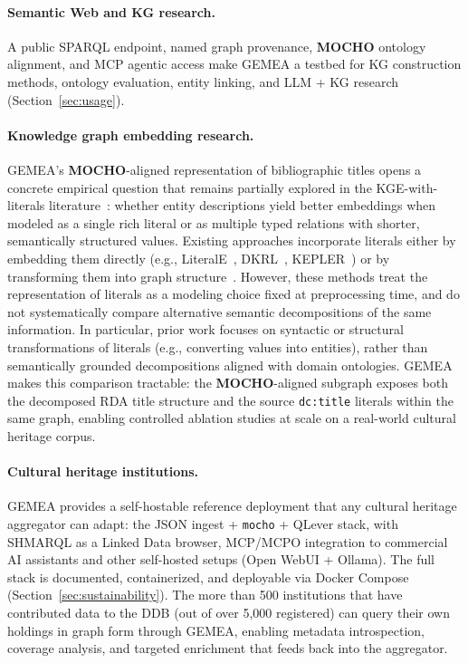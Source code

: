\paragraph{Semantic Web and KG research.}
A public SPARQL endpoint, named graph provenance, \textbf{MOCHO} ontology alignment, and MCP agentic access make GEMEA a testbed for KG construction methods, ontology evaluation, entity linking, and LLM + KG research (Section~\ref{sec:usage}).

\paragraph{Knowledge graph embedding research.}
GEMEA's \textbf{MOCHO}-aligned representation of bibliographic titles opens a concrete empirical question that remains partially explored in the KGE-with-literals literature~\cite{kristiadi2019incorporating,xie2016representation,wang2021kepler,blum2022literaltransformation}: whether entity descriptions yield better embeddings when modeled as a single rich literal or as multiple typed relations with shorter, semantically structured values.
Existing approaches incorporate literals either by embedding them directly (e.g., LiteralE~\cite{kristiadi2019incorporating}, DKRL~\cite{xie2016representation}, KEPLER~\cite{wang2021kepler}) or by transforming them into graph structure~\cite{blum2022literaltransformation}.  However, these methods treat the representation of literals as a modeling choice fixed at preprocessing time, and do not systematically compare alternative semantic decompositions of the same information. In particular, prior work focuses on syntactic or structural transformations of literals (e.g., converting values into entities), rather than semantically grounded decompositions aligned with domain ontologies.
GEMEA makes this comparison tractable: the \textbf{MOCHO}-aligned subgraph exposes both the decomposed RDA title structure and the source \texttt{dc:title} literals within the same graph, enabling controlled ablation studies at scale on a real-world cultural heritage corpus.


\paragraph{Cultural heritage institutions.}
GEMEA provides a self-hostable reference deployment that any cultural heritage aggregator can adapt: the JSON ingest + \texttt{mocho} + QLever stack, with SHMARQL as a Linked Data browser, MCP/MCPO integration to commercial AI assistants and other self-hosted setups (Open WebUI + Ollama). The full stack is documented, containerized, and deployable via Docker Compose (Section~\ref{sec:sustainability}).
The more than 500 institutions that have contributed data to the DDB (out of over 5,000 registered) can query their own holdings in graph form through GEMEA, enabling metadata introspection, coverage analysis, and targeted enrichment that feeds back into the aggregator.
